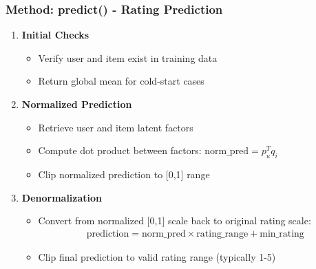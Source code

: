 \documentclass{beamer}
\begin{document}
\begin{frame}
\frametitle{Method: predict() - Rating Prediction}

\begin{enumerate}
    \item \textbf{Initial Checks}
    \begin{itemize}
        \item Verify user and item exist in training data
        \item Return global mean for cold-start cases
    \end{itemize}
    
    \item \textbf{Normalized Prediction}
    \begin{itemize}
        \item Retrieve user and item latent factors
        \item Compute dot product between factors: $\text{norm\_pred} = p_u^T q_i$
        \item Clip normalized prediction to [0,1] range
    \end{itemize}
    
    \item \textbf{Denormalization}
    \begin{itemize}
        \item Convert from normalized [0,1] scale back to original rating scale:
        \begin{align*}
        \text{prediction} = \text{norm\_pred} \times \text{rating\_range} + \text{min\_rating}
        \end{align*}
        \item Clip final prediction to valid rating range (typically 1-5)
    \end{itemize}
\end{enumerate}
\end{frame}
\end{document}
